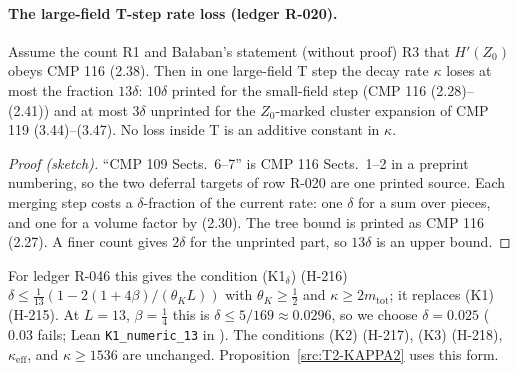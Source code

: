 \paragraph{The large-field T-step rate loss (ledger R-020).}
\begin{proposition}\label{prop:L034}
Assume the count R1 and Ba{\l}aban's statement (without proof) R3 that $H'(Z_0)$ obeys CMP 116 (2.38). Then in one large-field T step the decay rate $\kappa$ loses at most the fraction $13\delta$: $10\delta$ printed for the small-field step (CMP 116 (2.28)--(2.41)) and at most $3\delta$ unprinted for the $Z_0$-marked cluster expansion of CMP 119 (3.44)--(3.47). No loss inside T is an additive constant in $\kappa$.
\end{proposition}
\begin{proof}[Proof (sketch)]
``CMP 109 Sects.\ 6--7'' is CMP 116 Sects.\ 1--2 in a preprint numbering, so the two deferral targets of row R-020 are one printed source. Each merging step costs a $\delta$-fraction of the current rate: one $\delta$ for a sum over pieces, and one for a volume factor by (2.30). The tree bound is printed as CMP 116 (2.27). A finer count gives $2\delta$ for the unprinted part, so $13\delta$ is an upper bound.
\end{proof}
For ledger R-046 this gives the condition (K1$_\delta$) (H-216) $\delta\le\tfrac1{13}(1-2(1+4\beta)/(\theta_KL))$ with $\theta_K\ge\tfrac12$ and $\kappa\ge2m_{\mathrm{tot}}$; it replaces (K1) (H-215). At $L=13$, $\beta=\tfrac14$ this is $\delta\le5/169\approx0.0296$, so we choose $\delta=0.025$ ($0.03$ fails; Lean \texttt{K1\_numeric\_13} in ). The conditions (K2) (H-217), (K3) (H-218), $\kappa_{\mathrm{eff}}$, and $\kappa\ge1536$ are unchanged. Proposition~\ref{src:T2-KAPPA2} uses this form.


